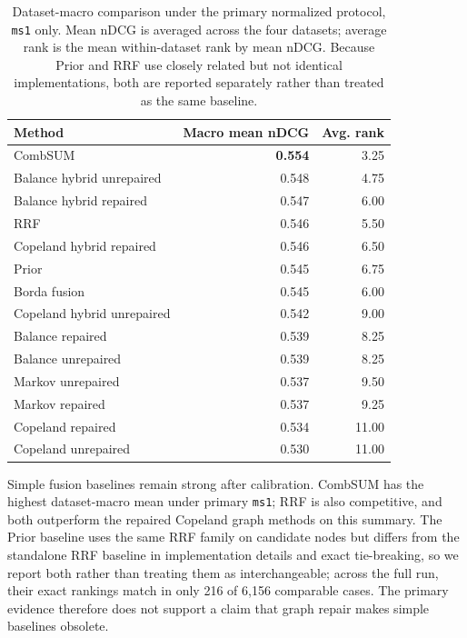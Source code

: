 \documentclass[manuscript,anonymous,review]{acmart}
\begin{document}
\begin{table}[t]
  \caption{Dataset-macro comparison under the primary normalized protocol,
    \texttt{ms1} only. Mean nDCG is averaged across the four datasets; average
    rank is the mean within-dataset rank by mean nDCG. Because Prior and RRF
    use closely related but not identical implementations, both are reported
    separately rather than treated as the same baseline.}
  \label{tab:pooled-baseline}
  \begin{tabular}{lrr}
    \toprule
    Method & Macro mean nDCG & Avg. rank \\
    \midrule
    CombSUM                  & \textbf{0.554} & 3.25 \\
    Balance hybrid unrepaired& 0.548 & 4.75 \\
    Balance hybrid repaired  & 0.547 & 6.00 \\
    RRF                      & 0.546 & 5.50 \\
    Copeland hybrid repaired & 0.546 & 6.50 \\
    Prior                    & 0.545 & 6.75 \\
    Borda fusion             & 0.545 & 6.00 \\
    Copeland hybrid unrepaired& 0.542 & 9.00 \\
    Balance repaired         & 0.539 & 8.25 \\
    Balance unrepaired       & 0.539 & 8.25 \\
    Markov unrepaired        & 0.537 & 9.50 \\
    Markov repaired          & 0.537 & 9.25 \\
    Copeland repaired        & 0.534 & 11.00 \\
    Copeland unrepaired      & 0.530 & 11.00 \\
    \bottomrule
  \end{tabular}
\end{table}

Simple fusion baselines remain strong after calibration. CombSUM has the
highest dataset-macro mean under primary \texttt{ms1}; RRF is also competitive,
and both outperform the repaired Copeland graph methods on this summary. The
Prior baseline uses the same RRF family on candidate nodes but differs from the
standalone RRF baseline in implementation details and exact tie-breaking, so we
report both rather than treating them as interchangeable; across the full run,
their exact rankings match in only 216 of 6,156 comparable cases. The
primary evidence therefore does not support a claim that graph repair makes
simple baselines obsolete.
\end{document}
